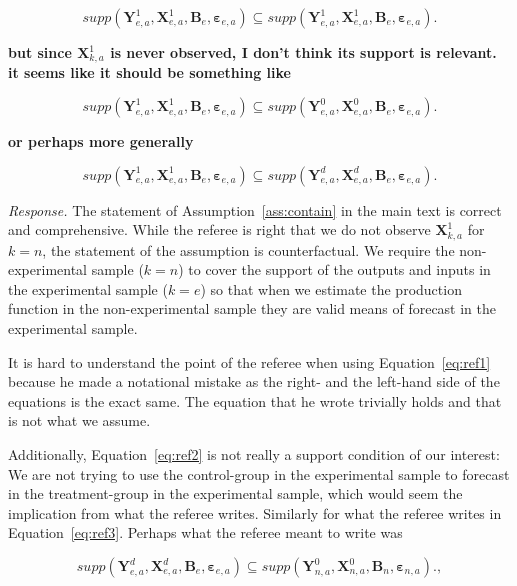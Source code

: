 \begin{equation}
supp( \bm{Y}_{e,a}^1, \bm{X}^1_{e,a}, \bm{B}_e, \bm{\varepsilon}_{e,a} ) \subseteq supp( \bm{Y}_{e,a}^1, \bm{X}^1_{e,a}, \bm{B}_e, \bm{\varepsilon}_{e,a} ). \label{eq:ref1}
\end{equation}

\textbf{but since $\bm{X}_{k,a}^1$ is never observed, I don't think its support is relevant. it seems like it should be something like} 

\begin{equation}
supp( \bm{Y}_{e,a}^1, \bm{X}^1_{e,a}, \bm{B}_e, \bm{\varepsilon}_{e,a} ) \subseteq supp( \bm{Y}_{e,a}^0, \bm{X}^0_{e,a}, \bm{B}_e, \bm{\varepsilon}_{e,a} ).  \label{eq:ref2}
\end{equation}

\textbf{or perhaps more generally}

\begin{equation}
supp( \bm{Y}_{e,a}^1, \bm{X}^1_{e,a}, \bm{B}_e, \bm{\varepsilon}_{e,a} ) \subseteq supp( \bm{Y}_{e,a}^d, \bm{X}^d_{e,a}, \bm{B}_e, \bm{\varepsilon}_{e,a} ).  \label{eq:ref3}
\end{equation}

\noindent \textit{Response.} The statement of Assumption~\ref{ass:contain} in the main text is correct and comprehensive. While the referee is right that we do not observe $\bm{X}_{k,a}^1$ for $k = n$, the statement of the assumption is counterfactual. We require the non-experimental sample ($k = n$) to cover the support of the outputs and inputs in the experimental sample ($k = e$) so that when we estimate the production function in the non-experimental sample they are valid means of forecast in the experimental sample. 

It is hard to understand the point of the referee when using Equation~\eqref{eq:ref1} because he made a notational mistake as the right- and the left-hand side of the equations is the exact same. The equation that he wrote trivially holds and that is not what we assume.

Additionally, Equation~\eqref{eq:ref2} is not really a support condition of our interest: We are not trying to use the control-group in the experimental sample to forecast in the treatment-group in the experimental sample, which would seem the implication from what the referee writes. Similarly for what the referee writes in Equation~\eqref{eq:ref3}. Perhaps what the referee meant to write was 

\begin{equation}
supp( \bm{Y}_{e,a}^d, \bm{X}^d_{e,a}, \bm{B}_e, \bm{\varepsilon}_{e,a} ) \subseteq supp( \bm{Y}_{n,a}^0, \bm{X}^0_{n,a}, \bm{B}_n, \bm{\varepsilon}_{n,a} ).  \label{eq:ref4},
\end{equation}

